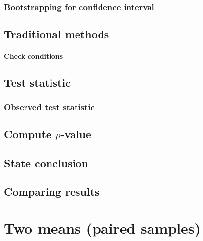 \documentclass[12pt, krantz2,]{krantz}
\let\oldparagraph\paragraph
\renewcommand{\paragraph}[1]{\oldparagraph{#1}\mbox{}}
\begin{document}
\hypertarget{bootstrapping-for-confidence-interval-3}{%
\subsubsection*{Bootstrapping for confidence interval}\label{bootstrapping-for-confidence-interval-3}}


\hypertarget{traditional-methods-3}{%
\subsection{Traditional methods}\label{traditional-methods-3}}

\hypertarget{check-conditions-3}{%
\paragraph{Check conditions}\label{check-conditions-3}}

\hypertarget{test-statistic-3}{%
\subsection{Test statistic}\label{test-statistic-3}}

\hypertarget{observed-test-statistic-3}{%
\subsubsection*{Observed test statistic}\label{observed-test-statistic-3}}


\hypertarget{compute-p-value-1}{%
\subsection{\texorpdfstring{Compute \(p\)-value}{Compute p-value}}\label{compute-p-value-1}}

\hypertarget{state-conclusion-3}{%
\subsection{State conclusion}\label{state-conclusion-3}}

\hypertarget{comparing-results-3}{%
\subsection{Comparing results}\label{comparing-results-3}}

\hypertarget{two-means-paired-samples}{%
\section{Two means (paired samples)}\label{two-means-paired-samples}}
\end{document}
